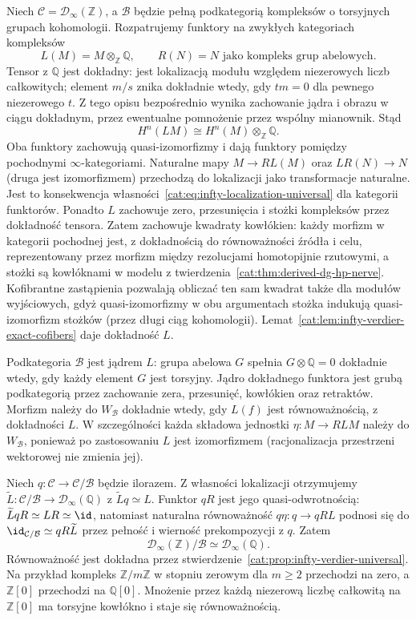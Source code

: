 \begin{przyklad}\label{cat:ex:infty-verdier-rationalization}
Niech $\mathcal C=\mathcal D_\infty(\mathbb Z)$, a $\mathcal B$ będzie pełną podkategorią kompleksów o torsyjnych grupach kohomologii. Rozpatrujemy funktory na zwykłych kategoriach kompleksów
\[
 L(M)=M\otimes_{\mathbb Z}\mathbb Q,\qquad
 R(N)=N\text{ jako kompleks grup abelowych}.
\]
Tensor z $\mathbb Q$ jest dokładny: jest lokalizacją modułu względem niezerowych liczb całkowitych; element $m/s$ znika dokładnie wtedy, gdy $tm=0$ dla pewnego niezerowego $t$. Z tego opisu bezpośrednio wynika zachowanie jądra i obrazu w ciągu dokładnym, przez ewentualne pomnożenie przez wspólny mianownik. Stąd
\[
 H^n(LM)\cong H^n(M)\otimes_{\mathbb Z}\mathbb Q.
\]
Oba funktory zachowują quasi-izomorfizmy i dają funktory pomiędzy pochodnymi $\infty$-kategoriami. Naturalne mapy $M\to RL(M)$ oraz $LR(N)\to N$ (druga jest izomorfizmem) przechodzą do lokalizacji jako transformacje naturalne. Jest to konsekwencja własności~\eqref{cat:eq:infty-localization-universal} dla kategorii funktorów. Ponadto $L$ zachowuje zero, przesunięcia i stożki kompleksów przez dokładność tensora. Zatem zachowuje kwadraty kowłókien: każdy morfizm w kategorii pochodnej jest, z dokładnością do równoważności źródła i celu, reprezentowany przez morfizm między rezolucjami homotopijnie rzutowymi, a stożki są kowłóknami w modelu z twierdzenia~\ref{cat:thm:derived-dg-hp-nerve}. Kofibrantne zastąpienia pozwalają obliczać ten sam kwadrat także dla modułów wyjściowych, gdyż quasi-izomorfizmy w obu argumentach stożka indukują quasi-izomorfizm stożków (przez długi ciąg kohomologii). Lemat~\ref{cat:lem:infty-verdier-exact-cofibers} daje dokładność $L$.

Podkategoria $\mathcal B$ jest jądrem $L$: grupa abelowa $G$ spełnia $G\otimes\mathbb Q=0$ dokładnie wtedy, gdy każdy element $G$ jest torsyjny. Jądro dokładnego funktora jest grubą podkategorią przez zachowanie zera, przesunięć, kowłókien oraz retraktów. Morfizm należy do $W_{\mathcal B}$ dokładnie wtedy, gdy $L(f)$ jest równoważnością, z dokładności $L$. W szczególności każda składowa jednostki $\eta:M\to RLM$ należy do $W_{\mathcal B}$, ponieważ po zastosowaniu $L$ jest izomorfizmem (racjonalizacja przestrzeni wektorowej nie zmienia jej).

Niech $q:\mathcal C\to\mathcal C/\mathcal B$ będzie ilorazem. Z własności lokalizacji otrzymujemy $\widetilde L:\mathcal C/\mathcal B\to\mathcal D_\infty(\mathbb Q)$ z $\widetilde Lq\simeq L$. Funktor $qR$ jest jego quasi-odwrotnością: $\widetilde LqR\simeq LR\simeq\id$, natomiast naturalna równoważność $q\eta:q\to qRL$ podnosi się do $\id_{\mathcal C/\mathcal B}\simeq qR\widetilde L$ przez pełność i wierność prekompozycji z $q$. Zatem
\[
 \mathcal D_\infty(\mathbb Z)/\mathcal B
 \simeq\mathcal D_\infty(\mathbb Q).
\]
Równoważność jest dokładna przez stwierdzenie~\ref{cat:prop:infty-verdier-universal}. Na przykład kompleks $\mathbb Z/m\mathbb Z$ w stopniu zerowym dla $m\geq2$ przechodzi na zero, a $\mathbb Z[0]$ przechodzi na $\mathbb Q[0]$. Mnożenie przez każdą niezerową liczbę całkowitą na $\mathbb Z[0]$ ma torsyjne kowłókno i staje się równoważnością.
\end{przyklad}


